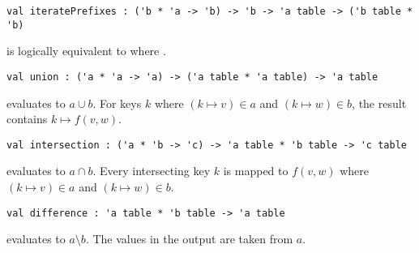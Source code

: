 \begin{cluster}
\label{grp:grm:table-interface::iterateprefixes}

\begin{gram}[iteratePrefixes]
\label{grm:table-interface::iterateprefixes}
\begin{verbatim}
val iteratePrefixes : ('b * 'a -> 'b) -> 'b -> 'a table -> ('b table * 'b)
\end{verbatim}
 is logically equivalent to
 where .

\end{gram}
\end{cluster}

\begin{cluster}
\label{grp:grm:table-interface::union}

\begin{gram}[union]
\label{grm:table-interface::union}
\begin{verbatim}
val union : ('a * 'a -> 'a) -> ('a table * 'a table) -> 'a table
\end{verbatim}
 evaluates to $a \cup b$. For keys $k$ where $(k \mapsto v) \in a$
and $(k \mapsto w) \in b$, the result contains $k \mapsto f(v,w)$.

\end{gram}
\end{cluster}

\begin{cluster}
\label{grp:grm:table-interface::intersection}

\begin{gram}[intersection]
\label{grm:table-interface::intersection}
\begin{verbatim}
val intersection : ('a * 'b -> 'c) -> 'a table * 'b table -> 'c table
\end{verbatim}
 evaluates to $a \cap b$. Every intersecting key
$k$ is mapped to $f(v,w)$ where $(k \mapsto v) \in a$ and $(k \mapsto w) \in b$.

\end{gram}
\end{cluster}

\begin{cluster}
\label{grp:grm:table-interface::difference}

\begin{gram}[difference]
\label{grm:table-interface::difference}
\begin{verbatim}
val difference : 'a table * 'b table -> 'a table
\end{verbatim}
 evaluates to $a \setminus b$. The values in the output
are taken from $a$.

\end{gram}
\end{cluster}

